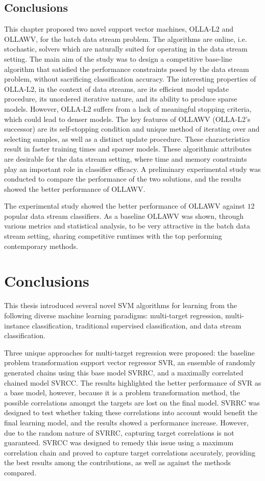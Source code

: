 \documentclass[reqno]{vcuthesis}
\numberwithin{equation}{chapter}
\begin{document}
\section{Conclusions}
This chapter proposed two novel support vector machines, OLLA-L2 and OLLAWV, for the batch data stream problem. The algorithms are online, i.e. stochastic, solvers which are naturally suited for operating in the data stream setting. The main aim of the study was to design a competitive base-line algorithm that satisfied the performance constraints posed by the data stream problem, without sacrificing classification accuracy. The interesting properties of OLLA-L2, in the context of data streams, are its efficient model update procedure, its unordered iterative nature, and its ability to produce sparse models. However, OLLA-L2 suffers from a lack of meaningful stopping criteria, which could lead to denser models. The key features of OLLAWV (OLLA-L2's successor) are its self-stopping condition and unique method of iterating over and selecting samples, as well as a distinct update procedure. These characteristics result in faster training times and sparser models. These algorithmic attributes are desirable for the data stream setting, where time and memory constraints play an important role in classifier efficacy. A preliminary experimental study was conducted to compare the performance of the two solutions, and the results showed the better performance of OLLAWV.

The experimental study showed the better performance of OLLAWV against $12$ popular data stream classifiers. As a baseline OLLAWV was shown, through various metrics and statistical analysis, to be very attractive in the batch data stream setting, sharing competitive runtimes with the top performing contemporary methods. 

\chapter{Conclusions}
This thesis introduced several novel SVM algorithms for learning from the following diverse machine learning paradigms: multi-target regression, multi-instance classification, traditional supervised classification, and data stream classification.

Three unique approaches for multi-target regression were proposed: the baseline problem transformation support vector regressor SVR, an ensemble of randomly generated chains using this base model SVRRC, and a maximally correlated chained model SVRCC. The results highlighted the better performance of SVR as a base model, however, because it is a problem transformation method, the possible correlations amongst the targets are lost on the final model. SVRRC was designed to test whether taking these correlations into account would benefit the final learning model, and the results showed a performance increase. However, due to the random nature of SVRRC, capturing target correlations is not guaranteed. SVRCC was designed to remedy this issue using a maximum correlation chain and proved to capture target correlations accurately, providing the best results among the contributions, as well as against the methods compared. 
\end{document}
